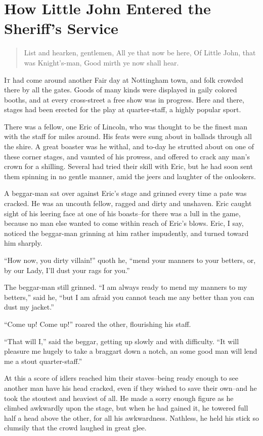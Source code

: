 \chapter{How Little John Entered the Sheriff’s Service}

\begin{quote}
List and hearken, gentlemen,
All ye that now be here,
Of Little John, that was Knight’s-man,
Good mirth ye now shall hear.
\end{quote}

\lettrine{I}{t} had come around another Fair day at Nottingham town, and folk crowded
there by all the gates. Goods of many kinds were displayed in gaily
colored booths, and at every cross-street a free show was in progress.
Here and there, stages had been erected for the play at quarter-staff, a
highly popular sport.

There was a fellow, one Eric of Lincoln, who was thought to be the
finest man with the staff for miles around. His feats were sung about in
ballads through all the shire. A great boaster was he withal, and to-day
he strutted about on one of these corner stages, and vaunted of his
prowess, and offered to crack any man's crown for a shilling. Several
had tried their skill with Eric, but he had soon sent them spinning in
no gentle manner, amid the jeers and laughter of the onlookers.

A beggar-man sat over against Eric's stage and grinned every time a pate
was cracked. He was an uncouth fellow, ragged and dirty and unshaven.
Eric caught sight of his leering face at one of his boasts--for there
was a lull in the game, because no man else wanted to come within reach
of Eric's blows. Eric, I say, noticed the beggar-man grinning at him
rather impudently, and turned toward him sharply.

``How now, you dirty villain!'' quoth he, ``mend your manners to your
betters, or, by our Lady, I'll dust your rags for you.''

The beggar-man still grinned. ``I am always ready to mend my manners to
my betters,'' said he, ``but I am afraid you cannot teach me any better
than you can dust my jacket.''

``Come up! Come up!'' roared the other, flourishing his staff.

``That will I,'' said the beggar, getting up slowly and with difficulty.
``It will pleasure me hugely to take a braggart down a notch, an some
good man will lend me a stout quarter-staff.''

At this a score of idlers reached him their staves--being ready enough
to see another man have his head cracked, even if they wished to save
their own--and he took the stoutest and heaviest of all. He made a sorry
enough figure as he climbed awkwardly upon the stage, but when he had
gained it, he towered full half a head above the other, for all his
awkwardness. Nathless, he held his stick so clumsily that the crowd
laughed in great glee.

